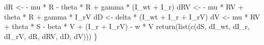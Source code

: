 \documentclass[
  11pt,
  letterpaper,
  DIV=11,
  numbers=noendperiod]{scrartcl}
\newenvironment{Shaded}{\begin{snugshade}}{\end{snugshade}}
\newcommand{\FunctionTok}[1]{\textcolor[rgb]{0.28,0.35,0.67}{#1}}
\newcommand{\NormalTok}[1]{\textcolor[rgb]{0.00,0.23,0.31}{#1}}
\newcommand{\OtherTok}[1]{\textcolor[rgb]{0.00,0.23,0.31}{#1}}
\newcommand{\SpecialCharTok}[1]{\textcolor[rgb]{0.37,0.37,0.37}{#1}}
\begin{document}
\begin{Shaded}
\begin{Highlighting}[]
\NormalTok{    dR    }\OtherTok{\textless{}{-}} \SpecialCharTok{{-}}\NormalTok{ mu }\SpecialCharTok{*}\NormalTok{ R }\SpecialCharTok{{-}}\NormalTok{ theta }\SpecialCharTok{*}\NormalTok{ R }\SpecialCharTok{+}\NormalTok{ gamma }\SpecialCharTok{*}\NormalTok{ (I\_wt }\SpecialCharTok{+}\NormalTok{ I\_r)}
\NormalTok{    dRV   }\OtherTok{\textless{}{-}} \SpecialCharTok{{-}}\NormalTok{ mu }\SpecialCharTok{*}\NormalTok{ RV }\SpecialCharTok{+}\NormalTok{ theta }\SpecialCharTok{*}\NormalTok{ R }\SpecialCharTok{+}\NormalTok{ gamma }\SpecialCharTok{*}\NormalTok{ I\_rV}
\NormalTok{    dD    }\OtherTok{\textless{}{-}}\NormalTok{ delta }\SpecialCharTok{*}\NormalTok{ (I\_wt }\SpecialCharTok{+}\NormalTok{ I\_r }\SpecialCharTok{+}\NormalTok{ I\_rV)}
\NormalTok{    dV    }\OtherTok{\textless{}{-}}\NormalTok{ mu }\SpecialCharTok{*}\NormalTok{ RV }\SpecialCharTok{+}\NormalTok{ theta }\SpecialCharTok{*}\NormalTok{ S }\SpecialCharTok{{-}}\NormalTok{ beta }\SpecialCharTok{*}\NormalTok{ V }\SpecialCharTok{+}\NormalTok{ (I\_r }\SpecialCharTok{+}\NormalTok{ I\_rV) }\SpecialCharTok{{-}}\NormalTok{ w }\SpecialCharTok{*}\NormalTok{ V}
    \FunctionTok{return}\NormalTok{(}\FunctionTok{list}\NormalTok{(}\FunctionTok{c}\NormalTok{(dS, dI\_wt, dI\_r, dI\_rV, dR, dRV, dD, dV)))}
\NormalTok{\}}



\end{Highlighting}
\end{Shaded}
\end{document}
